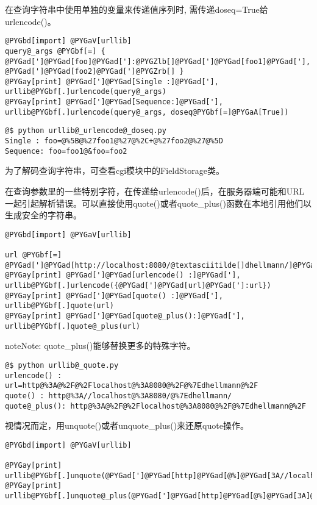\documentclass[letterpaper,10pt,english]{manual}
\begin{document}
在查询字符串中使用单独的变量来传递值序列时, 需传递doseq=True给urlencode()。

\begin{Verbatim}[commandchars=@\[\]]
@PYGbd[import] @PYGaV[urllib]
query@_args @PYGbf[=] { @PYGad[']@PYGad[foo]@PYGad[']:@PYGZlb[]@PYGad[']@PYGad[foo1]@PYGad['], @PYGad[']@PYGad[foo2]@PYGad[']@PYGZrb[] }
@PYGay[print] @PYGad[']@PYGad[Single :]@PYGad['], urllib@PYGbf[.]urlencode(query@_args)
@PYGay[print] @PYGad[']@PYGad[Sequence:]@PYGad['], urllib@PYGbf[.]urlencode(query@_args, doseq@PYGbf[=]@PYGaA[True])
\end{Verbatim}

\begin{Verbatim}[commandchars=@\[\]]
@$ python urllib@_urlencode@_doseq.py
Single : foo=@%5B@%27foo1@%27@%2C+@%27foo2@%27@%5D
Sequence: foo=foo1@&foo=foo2
\end{Verbatim}

为了解码查询字符串，可查看cgi模块中的FieldStorage类。

在查询参数里的一些特别字符，在传递给urlencode()后，在服务器端可能和URL一起引起解析错误。可以直接使用quote()或者quote\_plus()函数在本地引用他们以生成安全的字符串。

\begin{Verbatim}[commandchars=@\[\]]
@PYGbd[import] @PYGaV[urllib]

url @PYGbf[=] @PYGad[']@PYGad[http://localhost:8080/@textasciitilde[]dhellmann/]@PYGad[']
@PYGay[print] @PYGad[']@PYGad[urlencode() :]@PYGad['], urllib@PYGbf[.]urlencode({@PYGad[']@PYGad[url]@PYGad[']:url})
@PYGay[print] @PYGad[']@PYGad[quote() :]@PYGad['], urllib@PYGbf[.]quote(url)
@PYGay[print] @PYGad[']@PYGad[quote@_plus():]@PYGad['], urllib@PYGbf[.]quote@_plus(url)
\end{Verbatim}

\begin{notice}{note}{Note:}
quote\_plus()能够替换更多的特殊字符。
\end{notice}

\begin{Verbatim}[commandchars=@\[\]]
@$ python urllib@_quote.py
urlencode() : url=http@%3A@%2F@%2Flocalhost@%3A8080@%2F@%7Edhellmann@%2F
quote() : http@%3A//localhost@%3A8080/@%7Edhellmann/
quote@_plus(): http@%3A@%2F@%2Flocalhost@%3A8080@%2F@%7Edhellmann@%2F
\end{Verbatim}

视情况而定，用unquote()或者unquote\_plus()来还原quote操作。

\begin{Verbatim}[commandchars=@\[\]]
@PYGbd[import] @PYGaV[urllib]

@PYGay[print] urllib@PYGbf[.]unquote(@PYGad[']@PYGad[http]@PYGad[@%]@PYGad[3A//localhost]@PYGad[@%]@PYGad[3A8080/]@PYGbg[@%7E]@PYGad[dhellmann/]@PYGad['])
@PYGay[print] urllib@PYGbf[.]unquote@_plus(@PYGad[']@PYGad[http]@PYGad[@%]@PYGad[3A]@PYGbg[@%2F]@PYGbg[@%2F]@PYGad[localhost]@PYGad[@%]@PYGad[3A8080]@PYGbg[@%2F]@PYGbg[@%7E]@PYGad[dhellmann]@PYGbg[@%2F]@PYGad['])
\end{Verbatim}
\end{document}
